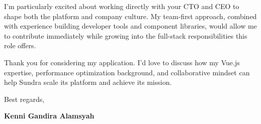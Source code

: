 \documentclass[11pt]{article}
\begin{document}
I'm particularly excited about working directly with your CTO and CEO to shape both the platform and company culture. My team-first approach, combined with experience building developer tools and component libraries, would allow me to contribute immediately while growing into the full-stack responsibilities this role offers.

Thank you for considering my application. I'd love to discuss how my Vue.js expertise, performance optimization background, and collaborative mindset can help Sundra scale its platform and achieve its mission.

\vspace{1em}

Best regards,

\textbf{Kenni Gandira Alamsyah}
\end{document}
